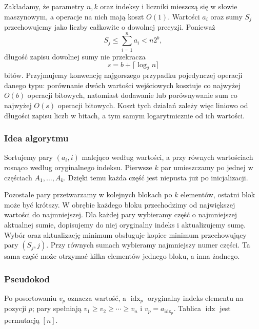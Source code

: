 \documentclass[11pt]{article}
\begin{document}
Zakładamy, że parametry $n,k$ oraz indeksy i liczniki mieszczą się w słowie maszynowym, a operacje na nich mają koszt $O(1)$. Wartości $a_i$ oraz sumy $S_j$ przechowujemy jako liczby całkowite o dowolnej precyzji. Ponieważ
\begin{equation}
  S_j\leq\sum_{i=1}^{n}a_i<n2^b,
\end{equation}
długość zapisu dowolnej sumy nie przekracza
\begin{equation}
  s=b+\lceil\log_2 n\rceil
\end{equation}
bitów. Przyjmujemy konwencję najgorszego przypadku pojedynczej operacji danego typu: porównanie dwóch wartości wejściowych kosztuje co najwyżej $O(b)$ operacji bitowych, natomiast dodawanie lub porównywanie sum co najwyżej $O(s)$ operacji bitowych. Koszt tych działań zależy więc liniowo od długości zapisu liczb w bitach, a tym samym logarytmicznie od ich wartości.


\subsubsection{Idea algorytmu}

Sortujemy pary $(a_i,i)$ malejąco według wartości, a przy równych
wartościach rosnąco według oryginalnego indeksu. Pierwsze $k$ par
umieszczamy po jednej w częściach $A_1,\ldots,A_k$. Dzięki temu każda
część jest niepusta już po inicjalizacji.

Pozostałe pary przetwarzamy w kolejnych blokach po $k$ elementów,
ostatni blok może być krótszy. W obrębie każdego bloku przechodzimy
od największej wartości do najmniejszej. Dla każdej pary wybieramy część
o najmniejszej aktualnej sumie, dopisujemy do niej oryginalny indeks
i aktualizujemy sumę. Wybór oraz aktualizację minimum obsługuje kopiec
minimum przechowujący pary $(S_j,j)$. Przy równych sumach wybieramy
najmniejszy numer części. Ta sama część może otrzymać kilka elementów
jednego bloku, a inna żadnego.

\subsubsection{Pseudokod}

Po posortowaniu $v_p$ oznacza wartość, a $\operatorname{idx}_p$ oryginalny
indeks elementu na pozycji $p$; pary spełniają
$v_1\geq v_2\geq\cdots\geq v_n$ i
$v_p=a_{\operatorname{idx}_p}$. Tablica $\operatorname{idx}$ jest
permutacją $[n]$.
\end{document}
